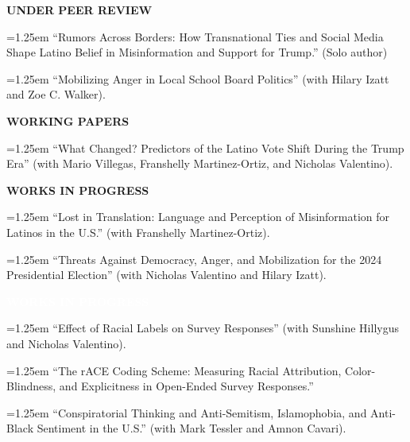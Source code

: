 \documentclass[11pt]{article}
\newlength{\leftcol}
\newlength{\rightcol}
\newcommand{\cvsection}[2]{%
\vspace{1.2em}
\noindent
\begin{minipage}[t]{\leftcol}
\raggedright \bfseries #1
\end{minipage}
\hspace{0.35in}
\begin{minipage}[t]{\rightcol}
#2
\end{minipage}
\par
}
\newcommand{\entry}[1]{%
\hangindent=1.25em
\hangafter=1
#1\par\vspace{0.35em}
}
\begin{document}
\cvsection{UNDER PEER REVIEW}{
\entry{``Rumors Across Borders: How Transnational Ties and Social Media Shape Latino Belief in Misinformation and Support for Trump.'' (Solo author)} 

\entry{``Mobilizing Anger in Local School Board Politics'' (with Hilary Izatt and Zoe C. Walker).}}

\cvsection{WORKING PAPERS}{
  \entry{``What Changed? Predictors of the Latino Vote Shift During the Trump Era'' (with Mario Villegas, Franshelly Martinez-Ortiz, and Nicholas Valentino).}
}

\cvsection{WORKS IN PROGRESS}{
  \entry{``Lost in Translation: Language and Perception of Misinformation for Latinos in the U.S.'' (with Franshelly Martinez-Ortiz).}

  \entry{``Threats Against Democracy, Anger, and Mobilization for the 2024 Presidential Election'' (with Nicholas Valentino and Hilary Izatt).}
}

\cvsection{\textcolor{white}{WORKS IN PROGRESS}}{
  \entry{``Effect of Racial Labels on Survey Responses'' (with Sunshine Hillygus and Nicholas Valentino).}

  \entry{``The rACE Coding Scheme: Measuring Racial Attribution, Color-Blindness, and Explicitness in Open-Ended Survey Responses.''}

  \entry{``Conspiratorial Thinking and Anti-Semitism, Islamophobia, and Anti-Black Sentiment in the U.S.'' (with Mark Tessler and Amnon Cavari).}
}
\end{document}
